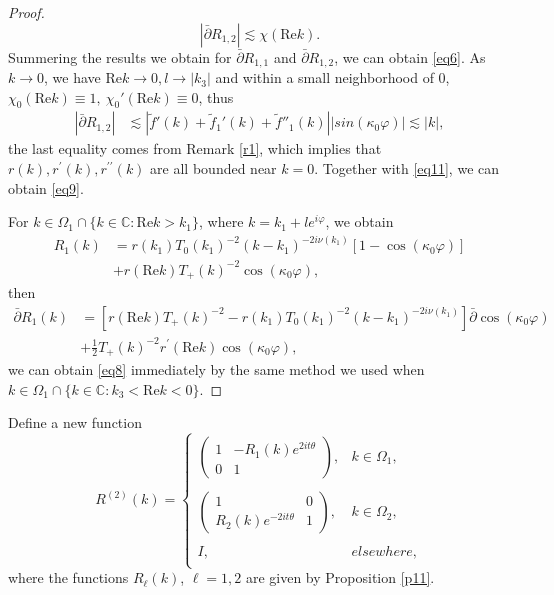 \documentclass[11pt]{article}
\numberwithin{equation}{section}
\begin{document}
\begin{proof}
\begin{equation}
|\bar{\partial}R_{1,2}|\lesssim\chi(\mathrm{Re}k).
\end{equation}
Summering the results we obtain for $\bar{\partial }R_{1,1}$ and  $\bar{\partial }R_{1,2}$, we can obtain \eqref{eq6}.
As $k\to 0$, we have $\mathrm{Re}k\to 0, l\to |k_3|$ and within a small neighborhood of $0$, $\chi_0(\mathrm{Re}k)\equiv1,\ \chi_0'(\mathrm{Re}k)\equiv0$,
thus
\begin{equation}
\begin{aligned}
\left|\bar{\partial}R_{1,2}\right|&\lesssim|\tilde{f}'(k)+\tilde{f}_1'(k)
+\tilde{f}''_1(k)||sin(\kappa_0\varphi)|\lesssim|k|,
\end{aligned}
\end{equation}
the last equality comes from Remark \ref{r1}, which implies that $r(k), r^{\prime}(k), r^{\prime\prime}(k)$ are all bounded near $k=0$. Together with \eqref{eq11}, we can obtain \eqref{eq9}.

    For $k\in\Omega_{1}\cap\{k\in\mathbb{C}:\mathrm{Re}k>k_1\}$, where $k=k_1+le^{i\varphi}$, we obtain
    \begin{align*}
        R_1(k)&=r(k_1)T_0(k_1)^{-2} (k-k_1)^{-2i\nu(k_1)}\left[1-\cos(\kappa_0\varphi)\right]\\
        &+r(\mathrm{Re}k)T_+(k)^{-2}\cos(\kappa_0\varphi),
    \end{align*}
then
\begin{align*}
\bar{\partial}R_1(k)&=\left[r(\mathrm{Re}k) T_+(k)^{-2}-r\left(k_1\right) T_0(k_1)^{-2}\left(k-k_1\right)^{-2 i \nu\left(k_1\right)}\right] \bar{\partial} \cos \left(\kappa_0\varphi\right) \nonumber\\
& +\frac{1}{2} T_+(k)^{-2} r^{\prime}(\mathrm{Re}k) \cos \left(\kappa_0\varphi\right) ,
\end{align*}
we can obtain \eqref{eq8} immediately by the same method we used when $k\in\Omega_{1}\cap\{k\in\mathbb{C}:k_3<\mathrm{Re}k<0\}$.


\end{proof}

Define  a new  function
\begin{equation}
R^{(2)}(k)=\left\{\begin{array}{lll}
\left(\begin{array}{cc}
1 & -R_{1}(k)e^{2it\theta}\\
0 & 1
\end{array}\right), & k\in \Omega_{1},\\
\\
\left(\begin{array}{cc}
1 & 0\\
R_{2}(k)e^{-2it\theta} & 1
\end{array}\right),  &k\in \Omega_{2},\\
\\
I,  &elsewhere,\\
\end{array}\right.
\end{equation}
where   the functions $R_{\ell}(k)$, $\ell=1,2$ are given by  Proposition \ref{p11}.
\end{document}
